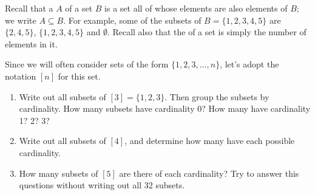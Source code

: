 \documentclass{book}
\begin{document}
\setcounter{cpjt}{65}
\addtocounter{cpjt}{-1}
\begin{activity}\label{activity-58}
\hypertarget{p-488}{}%
Recall that a  \(A\) of a set \(B\) is a set all of whose elements are also elements of \(B\); we write \(A \subseteq B\).  For example, some of the subsets of \(B = \{1,2,3,4,5\}\) are \(\{2,4,5\}\), \(\{1,2,3,4,5\}\) and \(\emptyset\).  Recall also that the  of a set is simply the number of elements in it.%
\par
\hypertarget{p-489}{}%
Since we will often consider sets of the form \(\{1,2,3,\ldots,n\}\), let's adopt the notation \([n]\) for this set.%
\begin{enumerate}[font=\bfseries,label=(\alph*),ref=\alph*]
\item\label{task-79} \hypertarget{p-490}{}%
Write out all subsets of \([3] = \{1,2,3\}\).  Then group the subsets by cardinality.  How many subsets have cardinality 0?  How many have cardinality 1?  2? 3?%
\item\label{task-80} \hypertarget{p-491}{}%
Write out all subsets of \([4]\), and determine how many have each possible cardinality.%
\item\label{task-81} \hypertarget{p-492}{}%
How many subsets of \([5]\) are there of each cardinality?  Try to answer this questions without writing out all 32 subsets.%
\end{enumerate}
\end{activity}

\clearpage
\end{document}
